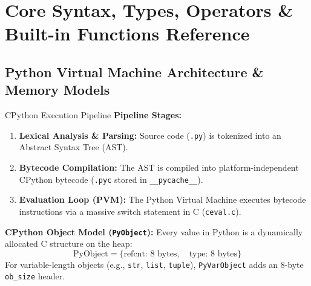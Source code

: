 \chapter{Core Syntax, Types, Operators \& Built-in Functions Reference}
\label{chap:syntax-types}

\section{Python Virtual Machine Architecture \& Memory Models}
\begin{formulabox}{CPython Execution Pipeline}
\textbf{Pipeline Stages:}
\begin{enumerate}[leftmargin=1.5em, itemsep=2pt]
    \item \textbf{Lexical Analysis \& Parsing:} Source code (\texttt{.py}) is tokenized into an Abstract Syntax Tree (AST).
    \item \textbf{Bytecode Compilation:} The AST is compiled into platform-independent CPython bytecode (\texttt{.pyc} stored in \texttt{\_\_pycache\_\_}).
    \item \textbf{Evaluation Loop (PVM):} The Python Virtual Machine executes bytecode instructions via a massive switch statement in C (\texttt{ceval.c}).
\end{enumerate}
\vspace{2mm}
\textbf{CPython Object Model (\texttt{PyObject}):}
Every value in Python is a dynamically allocated C structure on the heap:
\begin{equation}
\text{PyObject} = \{\text{refcnt: 8 bytes}, \quad \text{type: 8 bytes}\}
\end{equation}
For variable-length objects (e.g., \texttt{str}, \texttt{list}, \texttt{tuple}), \texttt{PyVarObject} adds an 8-byte \texttt{ob\_size} header.
\end{formulabox}

